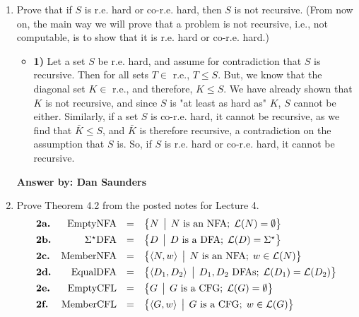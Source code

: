 \documentclass[12pt]{article}
\begin{document}
\noindent{}
\addtocounter{section}{1}

\begin{enumerate}

\item Prove that if $S$ is r.e. hard or co-r.e. hard, then $S$ is not recursive. (From now on, the main way we will
prove that a problem is not recursive, i.e., not computable, is to show that it is r.e. hard or co-r.e. hard.)

\begin{itemize}

\item \textbf{1)} Let a set $S$ be r.e. hard, and assume for contradiction that $S$ is recursive. Then for all sets $T \in$ r.e., $T \leq S$. But, we know that the diagonal set $K \in$ r.e., and therefore, $K \leq S$. We have already shown that $K$ is not recursive, and since $S$ is "at least as hard as" $K$, $S$ cannot be either. Similarly, if a set $S$ is co-r.e. hard, it cannot be recursive, as we find that $\bar{K} \leq S$, and $\bar{K}$ is therefore recursive, a contradiction on the assumption that $S$ is. So, if $S$ is r.e. hard or co-r.e. hard, it cannot be recursive.

\end{itemize}

{\bf Answer by: Dan Saunders} 

\item Prove Theorem 4.2 from the posted notes for Lecture 4.
\[
\begin{array}{lrcl}
\textbf{2a.}&\mbox{{\rm EmptyNFA}} &=& \bigl\{ N \,\bigm|\, N \mbox{ is an NFA};\; {\cal L}(N) = \emptyset \bigr\} \\[1ex]
\textbf{2b.}&\Sigma^\star\mbox{{\rm DFA}} &=& \bigl\{ D \,\bigm|\, D\mbox{ is a DFA};\;
  {\cal L}(D) = \Sigma^\star \bigr\}\\[1ex]
\textbf{2c.}&\mbox{{\rm MemberNFA}} &=& \bigl\{ \langle N,w \rangle \,\bigm|\, N \mbox{ is an NFA};\; w\in {\cal L}(N) \bigr\}\\[1ex]
\textbf{2d.}&\mbox{{\rm EqualDFA}} &=& \bigl\{ \langle D_1,D_2 \rangle \,\bigm|\, D_1,D_2 \mbox{ DFAs};\;{\cal L}(D_1) ={\cal L}(D_2) \bigr\}\\[1ex]
\textbf{2e.}&\mbox{{\rm EmptyCFL}} &=& \bigl\{ G \,\bigm|\, G \mbox{ is a CFG};\; {\cal L}(G) =
  \emptyset \bigr\} \\[1ex] 
\textbf{2f.}&\mbox{{\rm MemberCFL}} &=& \bigl\{ \langle G,w \rangle \,\bigm|\, G \mbox{ is a CFG};\;w\in{\cal L}(G) \bigr\}\\
\end{array}
\]


\end{enumerate}
\end{document}
